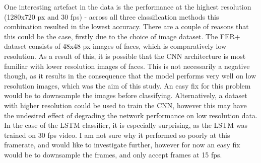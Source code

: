 \documentclass[sigconf]{acmart}
\begin{document}
{One interesting artefact in the data is the performance at the highest
resolution (1280x720 px and 30 fps) - across all three classification methods
this combination resulted in the lowest accuracy.
There are a couple of
reasons that this could be the case, firstly due to the choice of image
dataset. The FER+ dataset consists of 48x48 px images of faces, which is
comparatively low resolution. As a result of this, it is possible that
the CNN architecture is most familiar with lower resolution images of faces.
This is not necessarily a negative though, as it results in the consequence
that the model performs very well on low resolution images, which was the aim
of this study. 
An easy fix for this problem would be to downsample the images before
classifying. Alternatively, a dataset with higher resolution could be used to train the
CNN, however this may have the undesired effect of degrading the network
performance on low resolution data.
In the case of the LSTM classifier, it is especially surprising, as the LSTM
was trained on 30 fps video. I am not sure why it performed so poorly at this
framerate, and would like to investigate further, however for now an easy fix
would be to downsample the frames, and only accept frames at 15 fps.

}
\end{document}
